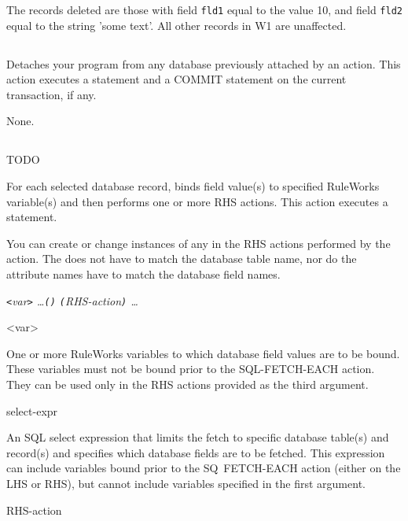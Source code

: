 {{The records deleted are those with field \verb|fld1| equal to the
value 10, and field \verb|fld2| equal to the string 'some text'. All
other records in W1 are unaffected.

\subsection{}

Detaches your program from any database previously attached by an
 action. This action executes a  statement and a
COMMIT statement on the current transaction, if any.

\Format


\Arguments

None.

\subsection{}
TODO

For each selected database record, binds field value(s) to specified
RuleWorks variable(s) and then performs one or more RHS actions. This
action executes a  statement.

You can create or change instances of any  in the RHS
actions performed by the  action. The
 does not have to match the database table name, nor
do the attribute names have to match the database field names.

\Format

 \verb|<|\it{var}\verb|>| \ldots \verb|(|\verb|)| \verb|(|\it{RHS-action}\verb|)| \ldots

<var>

One or more RuleWorks variables to which database field
values are to be bound. These variables must not be bound
prior to the SQL-FETCH-EACH action. They can be used only in
the RHS actions provided as the third argument.

select-expr

An SQL select expression that limits the fetch to specific
database table(s) and record(s) and specifies which database
fields are to be fetched. This expression can include
variables bound prior to the SQ~FETCH-EACH action (either on
the LHS or RHS), but cannot include variables specified in
the first argument.

RHS-action

}}
